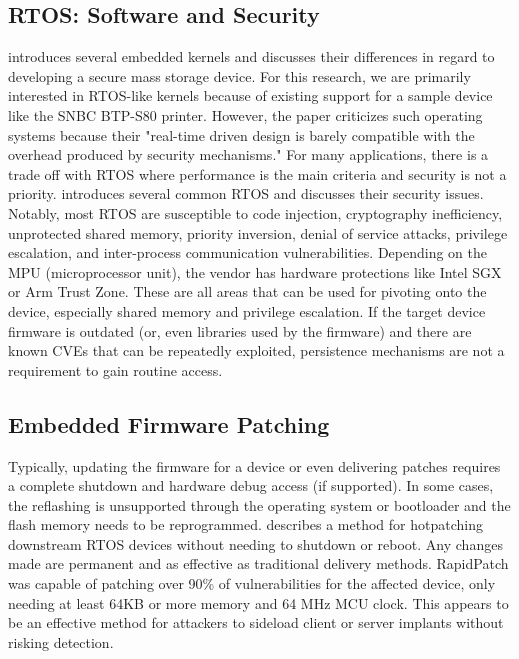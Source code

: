 \documentclass[conference]{IEEEtran}
\begin{document}
\subsection{RTOS: Software and Security}
\autocite{Benadjila2018WooKeyU} introduces several embedded kernels and discusses their differences in regard to developing a secure mass storage device. For this research, we are primarily interested in RTOS-like kernels because of existing support for a sample device like the SNBC BTP-S80 printer. However, the paper criticizes such operating systems because their "real-time driven design is barely compatible with the overhead produced by security mechanisms." For many applications, there is a trade off with RTOS where performance is the main criteria and security is not a priority. \autocite{yuRealTimeOperatingSystem} introduces several common RTOS and discusses their security issues. Notably, most RTOS are susceptible to code injection, cryptography inefficiency, unprotected shared memory, priority inversion, denial of service attacks, privilege escalation, and inter-process communication vulnerabilities. Depending on the MPU (microprocessor unit), the vendor has hardware protections like Intel SGX or Arm Trust Zone. These are all areas that can be used for pivoting onto the device, especially shared memory and privilege escalation. If the target device firmware is outdated (or, even libraries used by the firmware) and there are known CVEs that can be repeatedly exploited, persistence mechanisms are not a requirement to gain routine access.

\subsection{Embedded Firmware Patching}
Typically, updating the firmware for a device or even delivering patches requires a complete shutdown and hardware debug access (if supported). In some cases, the reflashing is unsupported through the operating system or bootloader and the flash memory needs to be reprogrammed. \autocite{heRapidPatchFirmwareHotpatching2022} describes a method for hotpatching downstream RTOS devices without needing to shutdown or reboot. Any changes made are permanent and as effective as traditional delivery methods. RapidPatch was capable of patching over 90\% of vulnerabilities for the affected device, only needing at least 64KB or more memory and 64 MHz MCU clock. This appears to be an effective method for attackers to sideload client or server implants without risking detection.
\end{document}
